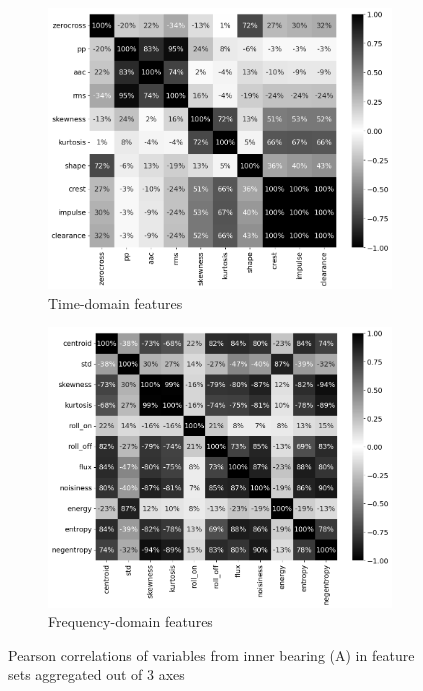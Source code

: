 \begin{figure}[h]
    \centering
    \begin{subfigure}[b]{0.48\textwidth}
        \includegraphics[width=\textwidth]{assets/results/feature-values/corr-A-3-TD.png}
        \caption{Time-domain features}
        \label{fig:design:corr-td}
    \end{subfigure}
    \hfill
    \begin{subfigure}[b]{0.48\textwidth}
        \includegraphics[width=\textwidth]{assets/results/feature-values/corr-A-3-FD.png}
        \caption{Frequency-domain features}
        \label{fig:design:corr-fd}
    \end{subfigure}
    \caption{Pearson correlations of variables from inner bearing (A) in feature sets aggregated out of 3 axes}
\end{figure}

